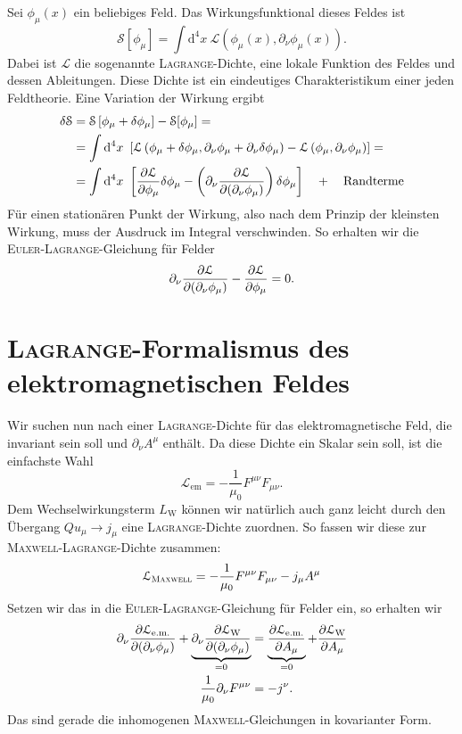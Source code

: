 Sei $\phi_\mu(x)$ ein beliebiges Feld. Das Wirkungsfunktional dieses Feldes ist
\begin{equation*}
\mathcal{S}[\phi_\mu]=\int\mathrm{d}^4x\ \mathcal{L}\left(\phi_\mu(x),\partial_\nu \phi_\mu(x)\right).
\end{equation*}
Dabei ist $\mathcal{L}$ die sogenannte \textsc{Lagrange}-Dichte, eine lokale Funktion des Feldes und dessen Ableitungen. Diese Dichte ist ein eindeutiges Charakteristikum einer jeden Feldtheorie. Eine Variation der Wirkung ergibt
\begin{align*}
\delta \mathcal{S} &= \mathcal{S}\left[\phi_\mu+\delta\phi_\mu\right]-\mathcal{S}[\phi_\mu]  = \\
&=\int\mathrm{d}^4 x\ \left[\mathcal{L}\left(\phi_\mu+\delta\phi_\mu,\partial_\nu\phi_\mu+\partial_\nu\delta\phi_\mu\right)-\mathcal{L}\left(\phi_\mu,\partial_\nu\phi_\mu \right)\right] =
\\ 
&= \int\mathrm{d}^4 x\ \left[\pdiff{\mathcal{L}}{\phi_\mu}\delta\phi_\mu -\left(\partial_\nu\pdiff{\mathcal{L}}{(\partial_\nu\phi_\mu)}\right)\delta\phi_\mu\right] \quad+ \quad\text{Randterme}
\end{align*}
Für einen stationären Punkt der Wirkung, also nach dem Prinzip der kleinsten Wirkung, muss der Ausdruck im Integral verschwinden. So erhalten wir die \textsc{Euler-Lagrange}-Gleichung für Felder
\begin{equation*}
\partial_\nu\frac{\partial{\mathcal{L}}}{\partial{(\partial_\nu\phi_\mu)}} - \frac{\partial{\mathcal{L}}}{\partial{\phi_\mu}}= 0.
\end{equation*}  

\section[\textsc{Lagrange}: elektromagnetisches Feld]{\textsc{Lagrange}-Formalismus des elektromagnetischen Feldes}

Wir suchen nun nach einer \textsc{Lagrange}-Dichte für das elektromagnetische Feld, die invariant sein soll und $\partial_\nu A^\mu$ enthält. Da diese Dichte ein Skalar sein soll, ist die einfachste Wahl
\begin{equation*}
\mathcal{L}_\text{em}=-\frac{1}{\mu_0}F^{\mu\nu}F_{\mu\nu}.
\end{equation*}
Dem Wechselwirkungsterm $L_\text{W}$ können wir natürlich auch ganz leicht durch den Übergang $Qu_\mu\rightarrow j_\mu$ eine \textsc{Lagrange}-Dichte zuordnen. So fassen wir diese zur \textsc{Maxwell-Lagrange}-Dichte zusammen:
\begin{equation*}
\mathcal{L}_\textsc{Maxwell} = -\frac{1}{\mu_0}F^{\mu\nu}F_{\mu\nu} - j_\mu A^\mu
\end{equation*}  
Setzen wir das in die \textsc{Euler-Lagrange}-Gleichung für Felder ein, so erhalten wir
\begin{align*}
\partial_\nu\frac{\partial{\mathcal{L}_\text{e.m.}}}{\partial{(\partial_\nu\phi_\mu)}} + \underbrace{\partial_\nu\frac{\partial{\mathcal{L}_\text{W}}}{\partial{(\partial_\nu\phi_\mu)}}}_{=0} &= \underbrace{\frac{\partial{\mathcal{L}_\text{e.m.}}}{\partial{A_\mu}}}_{=0} + \frac{\partial{\mathcal{L}_\text{W}}}{\partial{A_\mu}}\\
\frac{1}{\mu_0}\partial_\nu F^{\mu\nu} &= -j^\nu.
\end{align*}
Das sind gerade die inhomogenen \textsc{Maxwell}-Gleichungen in kovarianter Form. 